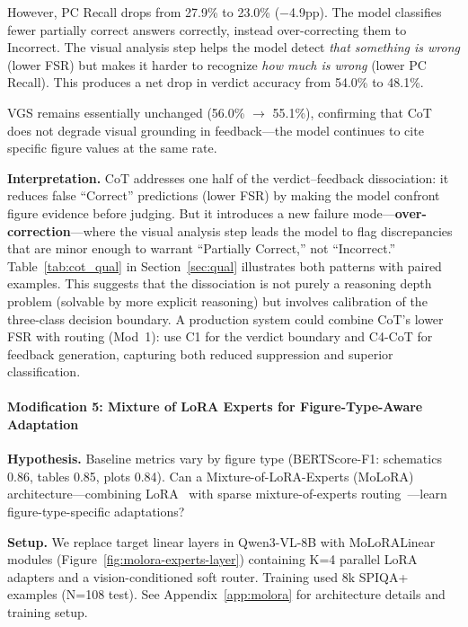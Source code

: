 \documentclass{article}
\begin{document}
However, PC Recall drops from 27.9\% to 23.0\% ($-$4.9pp). The model classifies
fewer partially correct answers correctly, instead over-correcting them to Incorrect.
The visual analysis step helps the model detect \textit{that something is wrong}
(lower FSR) but makes it harder to recognize \textit{how much is wrong} (lower PC
Recall). This produces a net drop in verdict accuracy from 54.0\% to 48.1\%.

VGS remains essentially unchanged (56.0\% $\to$ 55.1\%), confirming that CoT does
not degrade visual grounding in feedback---the model continues to cite specific
figure values at the same rate.

\textbf{Interpretation.} CoT addresses one half of the verdict--feedback
dissociation: it reduces false ``Correct'' predictions (lower FSR) by making the
model confront figure evidence before judging. But it introduces a new failure
mode---\textbf{over-correction}---where the visual analysis step leads the model to
flag discrepancies that are minor enough to warrant ``Partially Correct,'' not
``Incorrect.'' Table~\ref{tab:cot_qual} in Section~\ref{sec:qual} illustrates both
patterns with paired examples. This suggests that the dissociation is not purely a
reasoning depth problem (solvable by more explicit reasoning) but involves
calibration of the three-class decision boundary. A production system could combine
CoT's lower FSR with routing (Mod~1): use C1 for the verdict boundary and C4-CoT
for feedback generation, capturing both reduced suppression and superior
classification.

\paragraph{Modification 5: Mixture of LoRA Experts for Figure-Type-Aware Adaptation}

\textbf{Hypothesis.} Baseline metrics vary by figure type (BERTScore-F1: schematics 0.86,
tables 0.85, plots 0.84). Can a Mixture-of-LoRA-Experts (MoLoRA) architecture---combining
LoRA~\cite{hu2021lora} with sparse mixture-of-experts routing~\cite{shazeer2017moe}---learn
figure-type-specific adaptations?

\textbf{Setup.} We replace target linear layers in Qwen3-VL-8B with MoLoRALinear modules
(Figure~\ref{fig:molora-experts-layer}) containing K=4 parallel LoRA adapters and a
vision-conditioned soft router. Training used 8k SPIQA+ examples (N=108 test).
See Appendix~\ref{app:molora} for architecture details and training setup.
\end{document}
